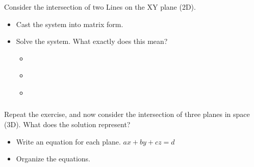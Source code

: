 \documentclass[fleqn]{beamer} %
\newcommand{\sectionIsubsectionIIItitle}{}
\begin{document}
			\begin{frame} 
				\frametitle{\sectionIsubsectionIIItitle}
				\bigskip

			 	Consider the intersection of two Lines on the XY plane (2D).  \hspace{5mm} 
  
				\begin{itemize}
		
					\item Cast the system into matrix form. \vspace{10mm}
			
					\item Solve the system. What exactly does this mean?\\
				
					\begin{itemize}
							\item \hspace{10mm} \\
							\item \hspace{10mm} \\
							\item \hspace{10mm} \\
					\end{itemize}
			
				\end{itemize}
	
				\btVFill
			\end{frame}	

			\begin{frame} 
				\frametitle{\sectionIsubsectionIIItitle}
				\bigskip

		 		Repeat the exercise, and now consider the intersection of three planes in space (3D). What does the solution represent?  \hspace{3mm} \\ 
  
				\begin{itemize}
		
					\item Write an equation for each plane.  $ax+by+cz=d$ \vspace{3mm} \\
		
					\item Organize the equations. \vspace{3mm} \\
				\end{itemize}
				
				\btVFill
			\end{frame}	
\end{document}
